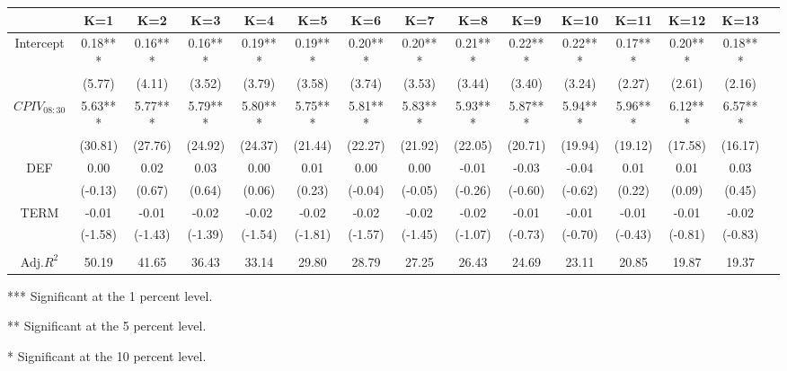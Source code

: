 \begin{table}[h]
\begin{threeparttable}
\begin{tabular}{ccccccccccccccc}
          & K=1     & K=2     & K=3     & K=4     & K=5     & K=6     & K=7     & K=8     & K=9     & K=10    & K=11    & K=12    & K=13    \\ \midrule
Intercept & 0.18*** & 0.16*** & 0.16*** & 0.19*** & 0.19*** & 0.20*** & 0.20*** & 0.21*** & 0.22*** & 0.22*** & 0.17*** & 0.20*** & 0.18*** \\
          & (5.77)  & (4.11)  & (3.52)  & (3.79)  & (3.58)  & (3.74)  & (3.53)  & (3.44)  & (3.40)  & (3.24)  & (2.27)  & (2.61)  & (2.16)  \\
$CPIV_{08:30}$& 5.63*** & 5.77*** & 5.79*** & 5.80*** & 5.75*** & 5.81*** & 5.83*** & 5.93*** & 5.87*** & 5.94*** & 5.96*** & 6.12*** & 6.57*** \\
          & (30.81) & (27.76) & (24.92) & (24.37) & (21.44) & (22.27) & (21.92) & (22.05) & (20.71) & (19.94) & (19.12) & (17.58) & (16.17) \\
DEF       & 0.00    & 0.02    & 0.03    & 0.00    & 0.01    & 0.00    & 0.00    & -0.01   & -0.03   & -0.04   & 0.01    & 0.01    & 0.03    \\
          & (-0.13) & (0.67)  & (0.64)  & (0.06)  & (0.23)  & (-0.04) & (-0.05) & (-0.26) & (-0.60) & (-0.62) & (0.22)  & (0.09)  & (0.45)  \\
TERM      & -0.01   & -0.01   & -0.02   & -0.02   & -0.02   & -0.02   & -0.02   & -0.02   & -0.01   & -0.01   & -0.01   & -0.01   & -0.02   \\
          & (-1.58) & (-1.43) & (-1.39) & (-1.54) & (-1.81) & (-1.57) & (-1.45) & (-1.07) & (-0.73) & (-0.70) & (-0.43) & (-0.81) & (-0.83) \\
          &         &         &         &         &         &         &         &         &         &         &         &         &         \\
Adj.$R^{2}$    & 50.19   & 41.65   & 36.43   & 33.14   & 29.80   & 28.79   & 27.25   & 26.43   & 24.69   & 23.11   & 20.85   & 19.87   & 19.37   \\

\bottomrule
\end{tabular}

\begin{tablenotes}
\item
\item[***]Significant at the 1 percent level.    
\item[**]Significant at the 5 percent level.   
\item[*]Significant at the 10 percent level.
\end{tablenotes}


\end{threeparttable}

\end{table}


